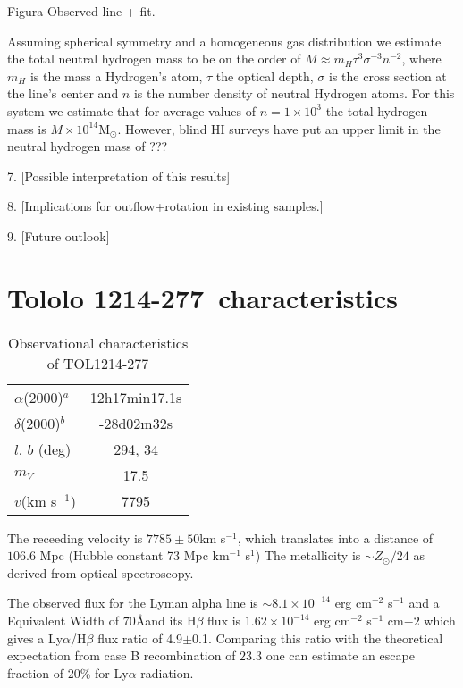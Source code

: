 \documentclass[a4paper, usenatbib, 12pt]{article}
\newcommand{\tol}{Tololo 1214-277}
\begin{document}
{Figura Observed line + fit. 


Assuming spherical symmetry and a homogeneous gas distribution we
estimate the total neutral hydrogen mass to be on the order of
$M\approx m_H\tau^3\sigma^{-3}n^{-2}$, where $m_H$ is the mass a
Hydrogen's atom, $\tau$  the optical depth, $\sigma$ is the cross
section at the line's center and $n$ is the number density of neutral
Hydrogen atoms. 
For this system we estimate that for average values of $n=1\times
10^3$ the total hydrogen mass is $M\times 10^{14}$M$_{\odot}$. 
However, blind HI
surveys have put an upper limit in the neutral hydrogen mass of ???

7. [Possible interpretation of this results]

8. [Implications for outflow+rotation in existing samples.]

9. [Future outlook]





{}


\newpage

\section*{\tol\ characteristics}


\begin{table}
\begin{center}
\begin{tabular}{lc}
$\alpha$(2000)$^{a}$ & 12h17min17.1s\\
$\delta$(2000)$^{b}$ & -28d02m32s\\
$l$, $b$ (deg) & 294, 34\\
$m_V$ & 17.5\\
$v$(km s$^{-1}$) & 7795
\end{tabular}
\end{center}

\caption{Observational characteristics of TOL1214-277
  \cite{Thuan97}\\} 
\end{table}

The receeding velocity is $7785\pm 50$km s$^{-1}$, which translates
into a distance of $106.6$ Mpc (Hubble constant 73 Mpc km$^{-1}$
s$^{1}$)
The metallicity is $\sim Z_{\odot}/24$ \cite{Izotov04} as derived from optical
spectroscopy. 

The observed flux for the Lyman alpha line is $\sim
8.1\times 10^{-14}$ erg cm$^{-2}$ s$^{-1}$ \cite{Thuan97}
and a Equivalent Width of $70$\AA and its H$\beta$ flux is 
$1.62\times 10^{-14}$ erg cm$^{-2}$ s$^{-1}$ cm${-2}$
\cite{Izotov04} which gives a Ly$\alpha$/H$\beta$ flux ratio of
4.9$\pm$0.1. 
Comparing this ratio with the theoretical expectation from case B
recombination of $23.3$ \cite{Hummer1987} one can estimate an escape
fraction of $20$\% for Ly$\alpha$ radiation.

}
\end{document}
